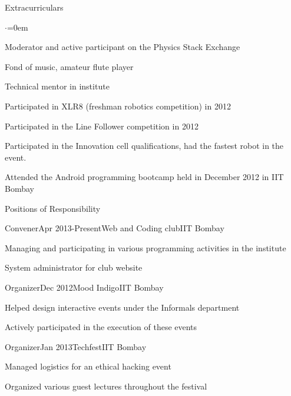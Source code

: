 \documentclass[a4paper,11pt]{resume}%
\begin{document}
\begin{rSection}{Extracurriculars}
\begin{list}{$\cdot$}{\leftmargin=0em}
\item Moderator and active participant on the Physics Stack Exchange
\item Fond of music, amateur flute player
\item Technical mentor in institute
\item Participated in XLR8 (freshman robotics competition) in 2012
\item Participated in the Line Follower competition in 2012
\item Participated in the Innovation cell qualifications, had the fastest robot in the event.
\item Attended the Android programming bootcamp held in December 2012 in IIT Bombay
\end{list}
\end{rSection}
\begin{rSection}{Positions of Responsibility}
\begin{rSubsection}{Convener}{Apr 2013-Present}{Web and Coding club}{IIT Bombay}
\item Managing and participating in various programming activities in the institute
\item System administrator for club website
\end{rSubsection}
\begin{rSubsection}{Organizer}{Dec 2012}{Mood Indigo}{IIT Bombay}
\item Helped design interactive events under the Informals department
\item Actively participated in the execution of these events
\end{rSubsection}
\begin{rSubsection}{Organizer}{Jan 2013}{Techfest}{IIT Bombay}
\item Managed logistics for an ethical hacking event
\item Organized various guest lectures throughout the festival
\end{rSubsection}
\end{rSection}
%
%
%
%
\end{document}
